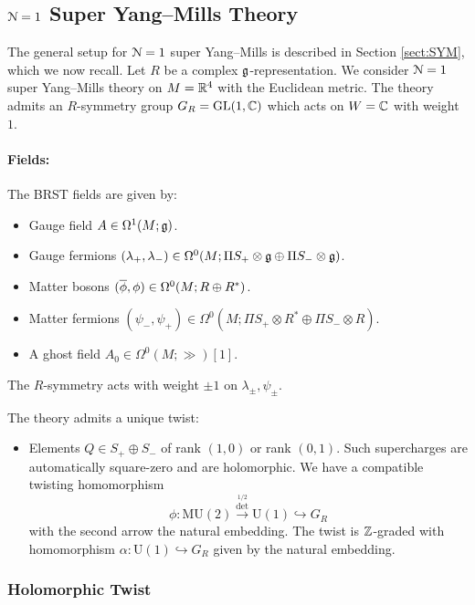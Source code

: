 \documentclass[10pt, oneside]{article}
\newcommand{\MU}{\mathrm{MU}}
\renewcommand{\U}{\mathrm{U}}
\begin{document}
\subsection{\texorpdfstring{$\cN=1$}{N=1} Super Yang--Mills Theory} \label{sect:4d_1_section}
The general setup for $\cN=1$ super Yang--Mills is described in Section \ref{sect:SYM}, which we now recall.  Let $R$ be a complex $\fg$-representation. We consider $\cN=1$ super Yang--Mills theory on $M=\RR^4$ with the Euclidean metric. The theory admits an $R$-symmetry group $G_R=\GL(1, \CC)$ which acts on $W=\CC$ with weight $1$.

\vspace{-10pt}
\paragraph{Fields:} The BRST fields are given by:
\begin{itemize}
\item Gauge field $A \in \Omega^1(M; \fg)$.
\item Gauge fermions $(\lambda_+, \lambda_-) \in \Omega^0(M; \Pi S_+ \otimes \fg \oplus \Pi S_- \otimes \fg)$.
\item Matter bosons $(\Bar{\phi}, \phi) \in \Omega^0(M; R \oplus R^*)$.
\item Matter fermions $(\psi_-,\psi_+) \in \Omega^0(M; \Pi S_+ \otimes R^* \oplus \Pi S_- \otimes R)$.
\item A ghost field $A_0\in \Omega^0(M; \gg)[1]$.
\end{itemize}

The $R$-symmetry acts with weight $\pm 1$ on $\lambda_\pm, \psi_\pm$.

The theory admits a unique twist:
\begin{itemize}
\item Elements $Q\in S_+\oplus S_-$ of rank $(1, 0)$ or rank $(0, 1)$. Such supercharges are automatically square-zero and are holomorphic. 
We have a compatible twisting homomorphism 
\[
\phi\colon \MU(2)\xrightarrow{\det^{1/2}}\U(1)\hookrightarrow G_R 
\]
with the second arrow the natural embedding.
The twist is $\ZZ$-graded with homomorphism $\alpha \colon \U(1) \hookrightarrow G_R$ given by the natural embedding.
\end{itemize}

\subsubsection{Holomorphic Twist}
\label{sect:4d1holomorphictwist}
\end{document}
